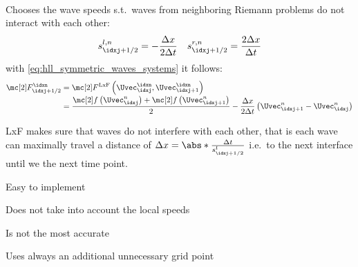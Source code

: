 \begin{defnbox}\nospacing
    \begin{defn}\label{defn:lax_friedrichs_scheme_non_linear_systems}\leavevmode\\
        Chooses the wave speeds s.t.\ waves from neighboring Riemann problems do not interact with each other:
        \begin{align}
          s_{\idxj+1/2}^{l,n}=-\frac{\Delta x}{2\Delta t}&&s_{\idxj+1/2}^{r,n}=\frac{2\Delta x}{\Delta t}
        \end{align}
        with \cref{eq:hll_symmetric_waves_systems} it follows:
        \begin{align}
          \Flux_{\idxj+1/2}^{\idxn}&=\Flux^{\text{LxF}}\left(\Uvec^{\idxn}_{\idxj},\Uvec^{\idxn}_{\idxj+1}\right)\\[-1\jot]
          &=\frac{\flux\left(\Uvec_{\idxj}^{n}\right)+\flux \left(\Uvec_{\idxj+1}^{n}\right)}{2}-\frac{\Delta x}{2\Delta t}\left(\Uvec_{\idxj+1}^{n}-\Uvec_{\idxj}^{n}\right)\nonumber
        \end{align}
    \end{defn}
\end{defnbox}
\begin{explanationbox}\nospacing
    \begin{explanation}
        LxF makes sure that waves do not interfere with each other, that is each wave can maximally travel a distance of $\Delta x=\abs*{\frac{\Delta t}{s_{\idxj+1/2}^{l}}}$ i.e.\ to the next interface until we the next time point.
    \end{explanation}
\end{explanationbox}
\begin{sectionbox}\nospacing
    \begin{minipage}[t]{0.4\textwidth}
       \begin{proslist}
           \item Easy to implement
       \end{proslist}
    \end{minipage}
    \begin{minipage}[t]{0.55\textwidth}
       \begin{conslist}
           \item Does not take into account the local speeds
           \item Is not the most accurate
           \item Uses always an additional unnecessary grid point
       \end{conslist}
    \end{minipage}
\end{sectionbox}

